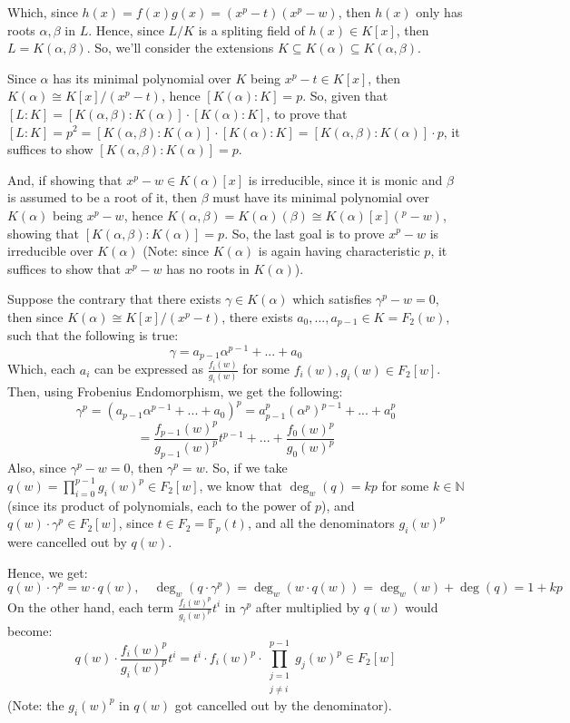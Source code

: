 \documentclass{article}
\begin{document}
\begin{itemize}
    Which, since $h(x)=f(x)g(x)=(x^p-t)(x^p-w)$, then $h(x)$ only has roots $\alpha,\beta$ in $L$. Hence, since $L/K$ is a spliting field of $h(x)\in K[x]$, then $L=K(\alpha,\beta)$. So, we'll consider the extensions $K\subseteq K(\alpha)\subseteq K(\alpha,\beta)$.

    \hfil

    Since $\alpha$ has its minimal polynomial over $K$ being $x^p-t\in K[x]$, then $K(\alpha)\cong K[x]/(x^p-t)$, hence $[K(\alpha):K]=p$.
    So, given that $[L:K]=[K(\alpha,\beta):K(\alpha)]\cdot [K(\alpha):K]$, to prove that $[L:K]=p^2 = [K(\alpha,\beta):K(\alpha)]\cdot [K(\alpha):K] = [K(\alpha,\beta):K(\alpha)]\cdot p$, it suffices to show $[K(\alpha,\beta):K(\alpha)] = p$. 
    
    And, if showing that $x^p-w\in K(\alpha)[x]$ is irreducible, since it is monic and $\beta$ is assumed to be a root of it, then $\beta$ must have its minimal polynomial over $K(\alpha)$ being $x^p-w$, hence $K(\alpha,\beta) = K(\alpha)(\beta)\cong K(\alpha)[x](^p-w)$, showing that $[K(\alpha,\beta):K(\alpha)]=p$. So, the last goal is to prove $x^p-w$ is irreducible over $K(\alpha)$ (Note: since $K(\alpha)$ is again having characteristic $p$, it suffices to show that $x^p-w$ has no roots in $K(\alpha)$).

    Suppose the contrary that there exists $\gamma\in K(\alpha)$ which satisfies $\gamma^p-w = 0$, then since $K(\alpha)\cong K[x]/(x^p-t)$, there exists $a_0,...,a_{p-1}\in K = F_2(w)$, such that the following is true:
    $$\gamma = a_{p-1}\alpha^{p-1}+...+a_0$$
    Which, each $a_i$ can be expressed as $\frac{f_i(w)}{g_i(w)}$ for some $f_i(w), g_i(w)\in F_2[w]$. Then, using Frobenius Endomorphism, we get the following:
    $$\gamma^p = (a_{p-1}\alpha^{p-1}+...+a_0)^p = a_{p-1}^p(\alpha^p)^{p-1} + ... + a_0^p$$
    $$ = \frac{f_{p-1}(w)^p}{g_{p-1}(w)^p}t^{p-1}+...+\frac{f_0(w)^p}{g_0(w)^p}$$
    Also, since $\gamma^p-w = 0$, then $\gamma^p=w$. So, if we take $q(w) = \prod_{i=0}^{p-1}g_i(w)^p\in F_2[w]$, we know that $\deg_w(q) = kp$ for some $k\in \mathbb{N}$ (since its product of polynomials, each to the power of $p$), and $q(w)\cdot \gamma^p\in F_2[w]$, since $t\in F_2=\mathbb{F}_p(t)$, and all the denominators $g_i(w)^p$ were cancelled out by $q(w)$.
    
    Hence, we get:
    $$q(w)\cdot \gamma^p = w \cdot q(w),\quad \deg_w(q\cdot \gamma^p) = \deg_w(w\cdot q(w)) =\deg_w(w)+\deg(q)= 1+kp$$
    On the other hand, each term $\frac{f_i(w)^p}{g_i(w)^p}t^i$ in $\gamma^p$ after multiplied by $q(w)$ would become:
    $$q(w)\cdot \frac{f_i(w)^p}{g_i(w)^p}t^i = t^i\cdot f_i(w)^p\cdot \prod_{\substack{j=1\\j\neq i}}^{p-1}g_j(w)^p\in F_2[w]$$
    (Note: the $g_i(w)^p$ in $q(w)$ got cancelled out by the denominator).


\end{itemize}
\end{document}

